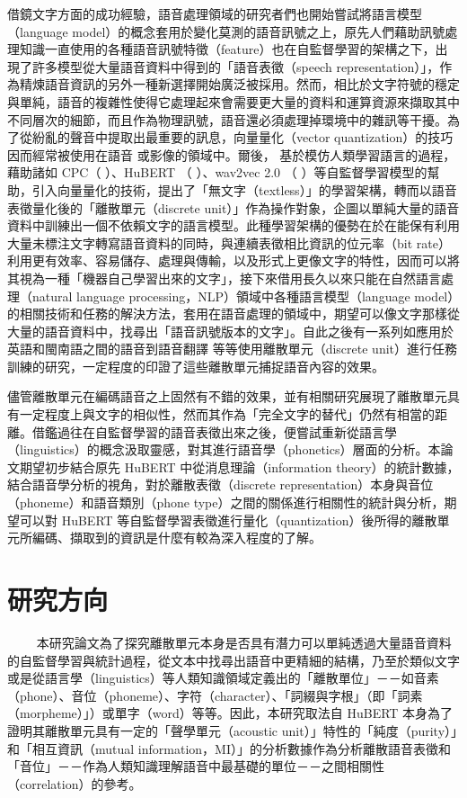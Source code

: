 借鏡文字方面的成功經驗，語音處理領域的研究者們也開始嘗試將語言模型（language model）的概念套用於變化莫測的語音訊號之上，原先人們藉助訊號處理知識一直使用的各種語音訊號特徵（feature）也在自監督學習的架構之下，出現了許多模型從大量語音資料中得到的「語音表徵（speech representation）」，作為精煉語音資訊的另外一種新選擇開始廣泛被採用。然而，相比於文字符號的穩定與單純，語音的複雜性使得它處理起來會需要更大量的資料和運算資源來擷取其中不同層次的細節，而且作為物理訊號，語音還必須處理掉環境中的雜訊等干擾。為了從紛亂的聲音中提取出最重要的訊息，向量量化（vector quantization）的技巧因而經常被使用在語音 \cite{chorowski2019unsupervised, chen2023vector, zhao2023speech} 或影像的領域中。爾後， \cite{lakhotia2021generative}  基於模仿人類學習語言的過程，藉助諸如 CPC（\cite{oord2019representation} ）、HuBERT （\cite{hsu2021hubert} ）、wav2vec 2.0 （\cite{baevski2020wav2vec} ）等自監督學習模型的幫助，引入向量量化的技術，提出了「無文字（textless）」的學習架構，轉而以語音表徵量化後的「離散單元（discrete unit）」作為操作對象，企圖以單純大量的語音資料中訓練出一個不依賴文字的語言模型。此種學習架構的優勢在於在能保有利用大量未標注文字轉寫語音資料的同時，與連續表徵相比資訊的位元率（bit rate）利用更有效率、容易儲存、處理與傳輸，以及形式上更像文字的特性，因而可以將其視為一種「機器自己學習出來的文字」，接下來借用長久以來只能在自然語言處理（natural language processing，NLP）領域中各種語言模型（language model）的相關技術和任務的解決方法，套用在語音處理的領域中，期望可以像文字那樣從大量的語音資料中，找尋出「語音訊號版本的文字」。自此之後有一系列如應用於英語和閩南語之間的語音到語音翻譯 \cite{chen2023speech} 等等使用離散單元（discrete unit）進行任務訓練的研究，一定程度的印證了這些離散單元捕捉語音內容的效果。

儘管離散單元在編碼語音之上固然有不錯的效果，並有相關研究展現了離散單元具有一定程度上與文字的相似性，然而其作為「完全文字的替代」仍然有相當的距離。借鑑過往在自監督學習的語音表徵出來之後，便嘗試重新從語言學（linguistics）的概念汲取靈感，對其進行語音學（phonetics）層面的分析。本論文期望初步結合原先 HuBERT 中從消息理論（information theory）的統計數據，結合語音學分析的視角，對於離散表徵（discrete representation）本身與音位（phoneme）和語音類別（phone type）之間的關係進行相關性的統計與分析，期望可以對 HuBERT 等自監督學習表徵進行量化（quantization）後所得的離散單元所編碼、擷取到的資訊是什麼有較為深入程度的了解。

    
\section{研究方向}
　　
本研究論文為了探究離散單元本身是否具有潛力可以單純透過大量語音資料的自監督學習與統計過程，從文本中找尋出語音中更精細的結構，乃至於類似文字或是從語言學（linguistics）等人類知識領域定義出的「離散單位」－－如音素（phone）、音位（phoneme）、字符（character）、「詞綴與字根」（即「詞素（morpheme）」）或單字（word）等等。因此，本研究取法自 HuBERT 本身為了證明其離散單元具有一定的「聲學單元（acoustic unit）」特性的「純度（purity）」和「相互資訊（mutual information，MI）」的分析數據作為分析離散語音表徵和「音位」－－作為人類知識理解語音中最基礎的單位－－之間相關性（correlation）的參考。

